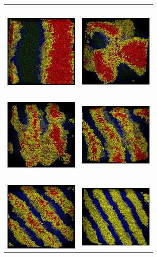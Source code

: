 \documentclass[
aip,
jcp,
reprint,
]{revtex4-1}
\begin{document}
\begin{figure}
	\centering
	\begin{tabular}{C{1.6in}@{}C{1.6in}}
		 \textcolor{white}{$w_{AB}=0.25$} & \textcolor{white}{$w_{AB}=0.40$} \\
		 \includegraphics[width=1.4in]{A5B5_025} & \includegraphics[width=1.4in]{A5B5_040} \\
		 \textcolor{white}{$w_{AB}=0.60$} & \textcolor{white}{$w_{AB}=0.65$} \\
		 \includegraphics[width=1.4in]{A5B5_060} & \includegraphics[width=1.4in]{A5B5_065} \\		
		 \textcolor{white}{$w_{AB}=0.75$} & \textcolor{white}{$w_{AB}=1.00$} \\
		 \includegraphics[width=1.4in]{A5B5_075} & \includegraphics[width=1.4in]{A5B5_100} \\		

\end{tabular}
\end{figure}
\end{document}
